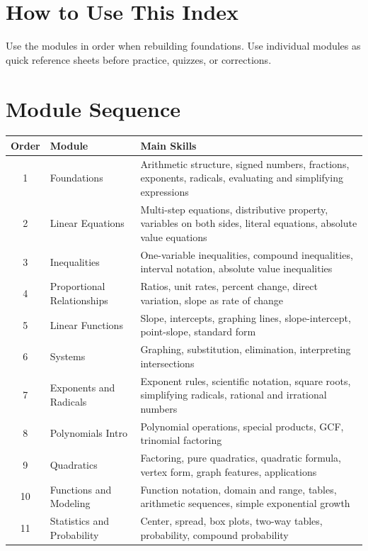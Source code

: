 \documentclass[11pt]{article}
\begin{document}

\section*{How to Use This Index}
Use the modules in order when rebuilding foundations. Use individual modules as quick reference sheets before practice, quizzes, or corrections.

\section*{Module Sequence}
\begin{center}
\begin{tabular}{clp{3.6in}}
\toprule
Order & Module & Main Skills \\
\midrule
1 & Foundations & Arithmetic structure, signed numbers, fractions, exponents, radicals, evaluating and simplifying expressions \\
2 & Linear Equations & Multi-step equations, distributive property, variables on both sides, literal equations, absolute value equations \\
3 & Inequalities & One-variable inequalities, compound inequalities, interval notation, absolute value inequalities \\
4 & Proportional Relationships & Ratios, unit rates, percent change, direct variation, slope as rate of change \\
5 & Linear Functions & Slope, intercepts, graphing lines, slope-intercept, point-slope, standard form \\
6 & Systems & Graphing, substitution, elimination, interpreting intersections \\
7 & Exponents and Radicals & Exponent rules, scientific notation, square roots, simplifying radicals, rational and irrational numbers \\
8 & Polynomials Intro & Polynomial operations, special products, GCF, trinomial factoring \\
9 & Quadratics & Factoring, pure quadratics, quadratic formula, vertex form, graph features, applications \\
10 & Functions and Modeling & Function notation, domain and range, tables, arithmetic sequences, simple exponential growth \\
11 & Statistics and Probability & Center, spread, box plots, two-way tables, probability, compound probability \\
\bottomrule
\end{tabular}
\end{center}
\end{document}
